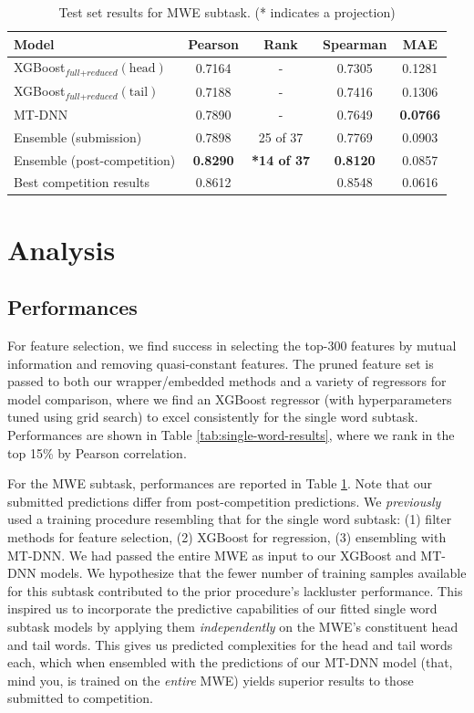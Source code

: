 \documentclass{dcthesis}
\theoremstyle{definition}
\theoremstyle{remark}
\begin{document}
\begin{table}[!htbp]
  \centering
  \begin{tabular}{l|cccc}
    \hline \textbf{Model} & \textbf{Pearson} & \textbf{Rank} & \textbf{Spearman} & \textbf{MAE} \\ \hline
    XGBoost$_{\textit{full}+\textit{reduced}}(\text{head})$ & 0.7164 & - & 0.7305 & 0.1281 \\
    XGBoost$_{\textit{full}+\textit{reduced}}(\text{tail})$ & 0.7188 & - & 0.7416 & 0.1306 \\
    MT-DNN & 0.7890 & - & 0.7649 & \textbf{0.0766} \\
    Ensemble (submission) & 0.7898 & 25 of 37 & 0.7769 & 0.0903 \\
    Ensemble (post-competition) & \textbf{0.8290} & \textbf{*14 of 37} & \textbf{0.8120} & 0.0857 \\
    \hline
    Best competition results & 0.8612 & &  0.8548 & 0.0616 \\ 
    \hline
  \end{tabular}
  \caption{\label{tab:multi-word-results} Test set results for MWE subtask. (* indicates a projection)}
\end{table}


\chapter{Analysis}

\section{Performances}

For feature selection, we find success in selecting the top-300 features by mutual information and removing quasi-constant features. The pruned feature set is passed to both our wrapper/embedded methods and a variety of regressors for model comparison, where we find an XGBoost regressor (with hyperparameters tuned using grid search) to excel consistently for the single word subtask. Performances are shown in Table \ref{tab:single-word-results}, where we rank in the top 15\% by Pearson correlation.

For the MWE subtask, performances are reported in Table \ref{tab:multi-word-results}. Note that our submitted predictions differ from post-competition predictions. We \textit{previously} used a training procedure resembling that for the single word subtask: (1) filter methods for feature selection, (2) XGBoost for regression, (3) ensembling with MT-DNN. We had passed the entire MWE as input to our XGBoost and MT-DNN models. We hypothesize that the fewer number of training samples available for this subtask contributed to the prior procedure's lackluster performance. This inspired us to incorporate the predictive capabilities of our fitted single word subtask models by applying them \textit{independently} on the MWE's constituent head and tail words. This gives us predicted complexities for the head and tail words each, which when ensembled with the predictions of our MT-DNN model (that, mind you, is trained on the \textit{entire} MWE) yields superior results to those submitted to competition.
\end{document}
